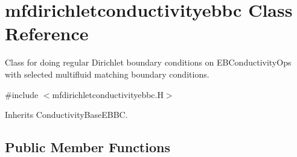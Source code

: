 \hypertarget{classmfdirichletconductivityebbc}{}\section{mfdirichletconductivityebbc Class Reference}
\label{classmfdirichletconductivityebbc}


Class for doing regular Dirichlet boundary conditions on E\+B\+Conductivity\+Ops with selected multifluid matching boundary conditions.  




{\ttfamily \#include $<$mfdirichletconductivityebbc.\+H$>$}



Inherits Conductivity\+Base\+E\+B\+BC.

\subsection*{Public Member Functions}
